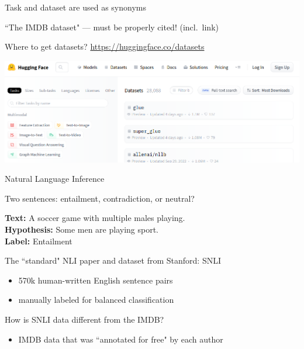 \documentclass[12pt,aspectratio=169,handout]{beamer}
\begin{document}
\begin{frame}{ Task and dataset are used as synonyms}

``The IMDB dataset" --- must be properly cited! (incl.\ link)

\begin{block}{Where to get datasets?}
\url{https://huggingface.co/datasets}

\includegraphics[width=0.97\linewidth]{img/hfdata.png}
\end{block}

\end{frame}

\begin{frame}{ Natural Language Inference}

Two sentences: entailment, contradiction, or neutral?

\begin{example}
\textbf{Text:} A soccer game with multiple males playing. \\
\textbf{Hypothesis:} Some men are playing sport. \\
\textbf{Label:} Entailment
\end{example}


The ``standard" NLI paper and dataset from Stanford: SNLI

\begin{itemize}
	\item 570k human-written English sentence pairs
	\item manually labeled for balanced classification
\end{itemize}


How is SNLI data different from the IMDB?

\begin{itemize}
	\item IMDB data that was ``annotated for free" by each author
\end{itemize}



\end{frame}
\end{document}
